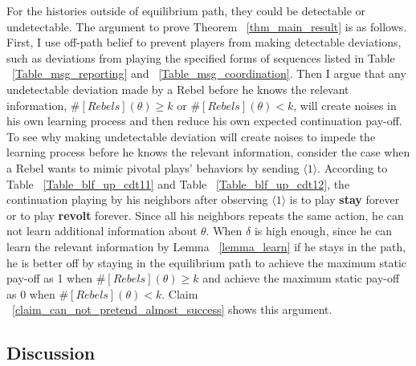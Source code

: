 \documentclass[12pt,letterpaper]{article}
\newtheorem*{main result}{Main Result}
\theoremstyle{definition}
\theoremstyle{remark}
\theoremstyle{claim}
\begin{document}
For the histories outside of equilibrium path, they could be detectable or undetectable. The argument to prove Theorem ~\ref{thm_main_result} is as follows. First, I use off-path belief to prevent players from making detectable deviations, such as deviations from playing the specified forms of sequences listed in Table ~\ref{Table_msg_reporting} and ~\ref{Table_msg_coordination}. Then I argue that any undetectable deviation made by a Rebel before he knows the relevant information, $\#[Rebels](\theta)\geq k$ or $\#[Rebels](\theta)< k$, will create noises in his own learning process and then reduce his own expected continuation pay-off.  To see why making undetectable deviation will create noises to impede the learning process before he knows the relevant information, consider the case when a Rebel wants to mimic pivotal plays' behaviors by sending $\langle 1 \rangle$. According to Table ~\ref{Table_blf_up_cdt11} and Table ~\ref{Table_blf_up_cdt12}, the continuation playing by his neighbors after observing $\langle 1 \rangle$ is to play \textbf{stay} forever or to play \textbf{revolt} forever. Since all his neighbors repeats the same action, he can not learn additional information about $\theta$. When $\delta$ is high enough, since he can learn the relevant information by Lemma ~\ref{lemma_learn} if he stays in the path, he is better off by staying in the equilibrium path to achieve the maximum static pay-off as 1 when $\#[Rebels](\theta)\geq k$ and achieve the maximum static pay-off as 0 when $\#[Rebels](\theta)< k$. Claim ~\ref{claim_can_not_pretend_almost_success} shows this argument.

\subsection{Discussion}
\label{sec:varies}
\end{document}

